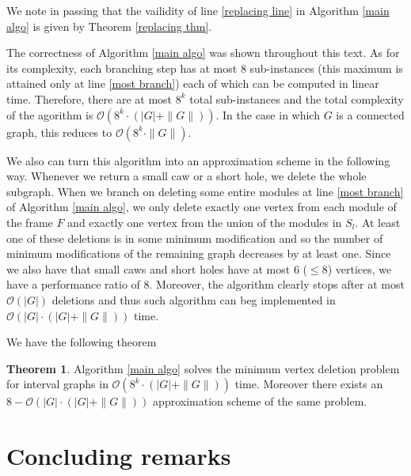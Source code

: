 \documentclass{article}
\theoremstyle{definition}
\newtheorem{thm}{Theorem}
\begin{document}
    We note in passing that the vailidity of
    line \ref{replacing line} in
    Algorithm \ref{main algo}
    is given by Theorem \ref{replacing thm}.
    
    The correctness of Algorithm \ref{main algo}
    was shown throughout this text.
    As for its complexity, each
    branching step has at most
    $8$ sub-instances (this
    maximum is attained only
    at line \ref{most branch}) each
    of which can be computed
    in linear time. Therefore,
    there are at most $8^{k}$ 
    total sub-instances and 
    the total complexity of the agorithm
    is $\mathcal{O} \left(8^{k} \cdot \left(\left|G\right| + \|G\|\right)\right)$.
    In the case in which $G$ is 
    a connected graph, this reduces to
    $\mathcal{O} \left(8^{k} \cdot \|G\|\right)$.

    We also can turn this
    algorithm into an approximation
    scheme in the following way. 
    Whenever we return a small caw
    or a short hole, we delete the whole
    subgraph. When we branch on deleting
    some entire modules at line \ref{most branch}
    of Algorithm \ref{main algo},
    we only delete exactly one
    vertex from each module of
    the frame $F$ and exactly
    one vertex from the
    union of the modules in $S_{l}$.
    At least one of these
    deletions is in some
    minimum modification and
    so the number of minimum
    modifications of the
    remaining graph decreases
    by at least one.
    Since we also have
    that small caws and short
    holes have at most $6$ ($ \leq 8$)
    vertices, we have
    a performance ratio of $8$.
    Moreover, the algorithm clearly stops
    after at most $\mathcal{O} \left(\left|G\right|\right)$ 
    deletions and thus
    such algorithm can beg
    implemented in $\mathcal{O} \left(\left|G\right| \cdot \left(\left|G\right| + \|G\|\right)\right)$
    time.

    We have the following theorem

    \begin{thm}
        Algorithm \ref{main algo} solves
        the minimum vertex deletion
        problem for interval graphs
        in $\mathcal{O} \left(8^{k} \cdot \left(\left|G\right| + \|G\|\right)\right)$ time.
        Moreover there exists
        an $8-\mathcal{O} \left(\left|G\right| \cdot \left(\left|G\right| + \|G\|\right)\right)$
        approximation scheme of the 
        same problem.
    \end{thm}

    \section{Concluding remarks}
    
\end{document}
